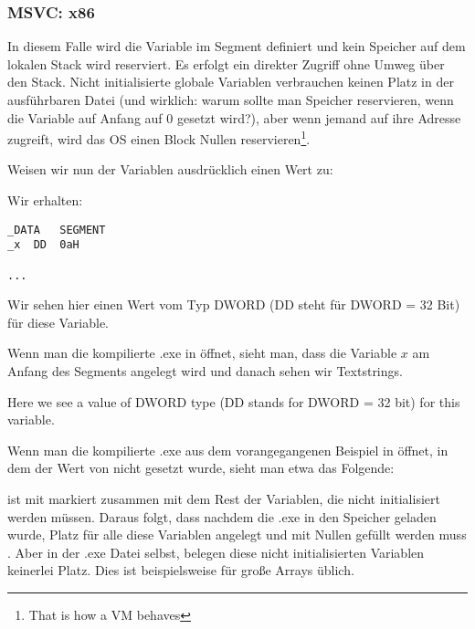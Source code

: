 \subsubsection{MSVC: x86}


In diesem Falle wird die Variable  im  Segment definiert und kein Speicher auf dem lokalen Stack wird
reserviert. Es erfolgt ein direkter Zugriff ohne Umweg über den Stack.
Nicht initialisierte globale Variablen verbrauchen keinen Platz in der ausführbaren Datei (und wirklich: warum sollte
man Speicher reservieren, wenn die Variable auf Anfang auf 0 gesetzt wird?), aber wenn jemand auf ihre Adresse zugreift,
wird das \ac{OS} einen Block Nullen reservieren\footnote{That is how a \ac{VM} behaves}.

Weisen wir nun der Variablen ausdrücklich einen Wert zu:



Wir erhalten:

\begin{lstlisting}[style=customasmx86]
_DATA	SEGMENT
_x	DD	0aH

...
\end{lstlisting}

Wir sehen hier einen Wert  vom Typ DWORD (DD steht für DWORD = 32 Bit) für diese Variable.

Wenn man die kompilierte .exe in \IDA öffnet, sieht man, dass die Variable $x$ am Anfang des  Segments
angelegt wird und danach sehen wir Textstrings. 

Here we see a value  of DWORD type (DD stands for DWORD = 32 bit) for this variable.

Wenn man die kompilierte .exe aus dem vorangegangenen Beispiel in \IDA öffnet, in dem der Wert von  nicht gesetzt
wurde, sieht man etwa das Folgende:



 ist mit  markiert zusammen mit dem Rest der Variablen, die nicht initialisiert werden müssen.
Daraus folgt, dass nachdem die .exe in den Speicher geladen wurde, Platz für alle diese Variablen angelegt und mit
Nullen gefüllt werden muss .
Aber in der .exe Datei selbst, belegen diese nicht initialisierten Variablen keinerlei Platz. 
Dies ist beispielsweise für große Arrays üblich.

